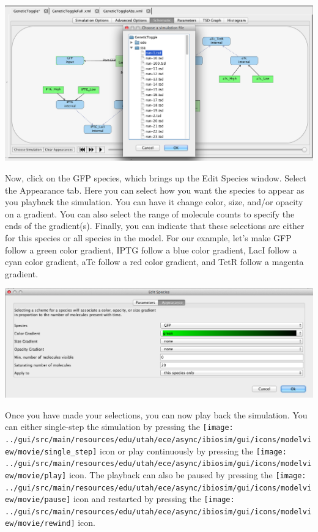 \documentclass[titlepage,11pt]{article}
\begin{document}
\begin{center}
\includegraphics[width=160mm]{screenshots/chooseSimGT}
\end{center}

Now, click on the GFP species, which brings up the Edit Species window.  Select the Appearance tab.  Here you can select how you want the species to appear as you playback the simulation.  You can have it change color, size, and/or opacity on a gradient.  You can also select the range of molecule counts to specify the ends of the gradient(s).  Finally, you can indicate that these selections are either for this species or all species in the model.  For our example, let's make GFP  follow a green color gradient, IPTG follow a blue color gradient, LacI follow a cyan color gradient, aTc follow a red color gradient, and TetR follow a magenta gradient.
\begin{center}
\includegraphics[width=160mm]{screenshots/editSpeciesAppearanceGT}
\end{center}

Once you have made your selections, you can now play back the simulation.  You can either single-step the simulation by pressing the \texttt{[image: ../gui/src/main/resources/edu/utah/ece/async/ibiosim/gui/icons/modelview/movie/single\_step]} icon or play continuously by pressing the \texttt{[image: ../gui/src/main/resources/edu/utah/ece/async/ibiosim/gui/icons/modelview/movie/play]} icon.  The playback can also be paused by pressing the \texttt{[image: ../gui/src/main/resources/edu/utah/ece/async/ibiosim/gui/icons/modelview/movie/pause]} icon and restarted by pressing the  \texttt{[image: ../gui/src/main/resources/edu/utah/ece/async/ibiosim/gui/icons/modelview/movie/rewind]} icon. 
\end{document}
